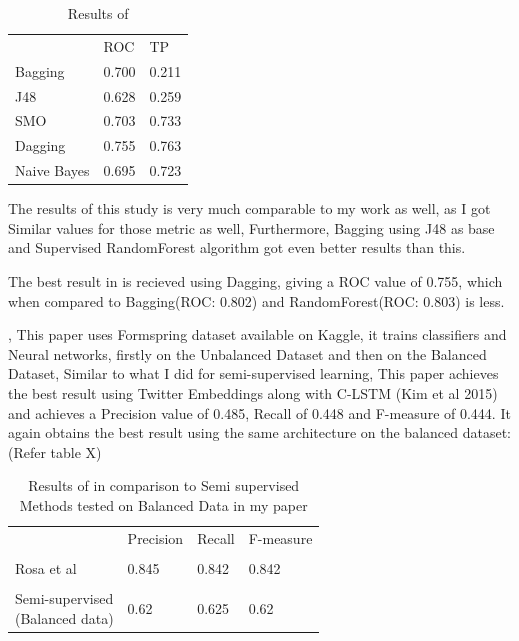 \documentclass[10pt,conference]{IEEEtran}
\begin{document}
\begin{table}[htbp]
\caption{Results of \cite{b10}}
\centering
\begin{tabular}{lll}
        & ROC & TP \\
       Bagging & 0.700 & 0.211\\
       J48 & 0.628 & 0.259\\
       SMO & 0.703 & 0.733 \\
       Dagging & 0.755 & 0.763 \\
       Naive Bayes & 0.695 & 0.723 
       
\end{tabular}
\end{table}
The results of this study is very much comparable to my work as well, as I got Similar values for those metric as well, Furthermore, Bagging using J48 as base and Supervised RandomForest algorithm got even better results than this.

The best result in \cite{b10} is recieved using Dagging, giving a ROC value of 0.755, which when compared to Bagging(ROC: 0.802) and RandomForest(ROC: 0.803) is less.

\cite{b11}, This paper uses Formspring dataset available on Kaggle, it trains classifiers and Neural networks, firstly on the Unbalanced Dataset and then on the Balanced Dataset, Similar to what I did for semi-supervised learning, This paper achieves the best result using Twitter Embeddings along with C-LSTM (Kim et al 2015) and achieves a Precision value of 0.485, Recall of 0.448 and F-measure of 0.444. It again obtains the best result using the same architecture on the balanced dataset:(Refer table X)


\begin{table}[htbp]
\caption{Results of \cite{b11} in comparison to Semi supervised Methods tested on Balanced Data in my paper}
\centering
\begin{tabular}{llll}
        & Precision & Recall & F-measure \\
        \\
       Rosa et al\cite{b11} & 0.845 & 0.842 & 0.842\\
       \\
       \makecell{Semi-supervised \\ (Balanced data)} & 0.62 & 0.625 & 0.62 \\
       
\end{tabular}
\end{table}
\end{document}
